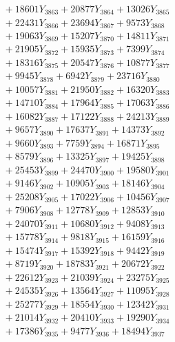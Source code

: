 \documentclass[a4paper,10pt]{article}
\begin{document}
{\begin{align}
&\;  + 18601 Y_{3863} + 20877 Y_{3864} + 13026 Y_{3865} \\[0.3ex]
&\;  + 22431 Y_{3866} + 23694 Y_{3867} + 9573 Y_{3868} \\[0.5ex]\allowbreak
&\;  + 19063 Y_{3869} + 15207 Y_{3870} + 14811 Y_{3871} \\[0.3ex]
&\;  + 21905 Y_{3872} + 15935 Y_{3873} + 7399 Y_{3874} \\[0.3ex]
&\;  + 18316 Y_{3875} + 20547 Y_{3876} + 10877 Y_{3877} \\[0.3ex]
&\;  + 9945 Y_{3878} + 6942 Y_{3879} + 23716 Y_{3880} \\[0.3ex]
&\;  + 10057 Y_{3881} + 21950 Y_{3882} + 16320 Y_{3883} \\[0.3ex]
&\;  + 14710 Y_{3884} + 17964 Y_{3885} + 17063 Y_{3886} \\[0.3ex]
&\;  + 16082 Y_{3887} + 17122 Y_{3888} + 24213 Y_{3889} \\[0.3ex]
&\;  + 9657 Y_{3890} + 17637 Y_{3891} + 14373 Y_{3892} \\[0.3ex]
&\;  + 9660 Y_{3893} + 7759 Y_{3894} + 16871 Y_{3895} \\[0.3ex]
&\;  + 8579 Y_{3896} + 13325 Y_{3897} + 19425 Y_{3898} \\[0.5ex]\allowbreak
&\;  + 25453 Y_{3899} + 24470 Y_{3900} + 19580 Y_{3901} \\[0.3ex]
&\;  + 9146 Y_{3902} + 10905 Y_{3903} + 18146 Y_{3904} \\[0.3ex]
&\;  + 25208 Y_{3905} + 17022 Y_{3906} + 10456 Y_{3907} \\[0.3ex]
&\;  + 7906 Y_{3908} + 12778 Y_{3909} + 12853 Y_{3910} \\[0.3ex]
&\;  + 24070 Y_{3911} + 10680 Y_{3912} + 9408 Y_{3913} \\[0.3ex]
&\;  + 15778 Y_{3914} + 9818 Y_{3915} + 16159 Y_{3916} \\[0.3ex]
&\;  + 15474 Y_{3917} + 15392 Y_{3918} + 9442 Y_{3919} \\[0.3ex]
&\;  + 8719 Y_{3920} + 18783 Y_{3921} + 20672 Y_{3922} \\[0.3ex]
&\;  + 22612 Y_{3923} + 21039 Y_{3924} + 23275 Y_{3925} \\[0.3ex]
&\;  + 24535 Y_{3926} + 13564 Y_{3927} + 11095 Y_{3928} \\[0.5ex]\allowbreak
&\;  + 25277 Y_{3929} + 18554 Y_{3930} + 12342 Y_{3931} \\[0.3ex]
&\;  + 21014 Y_{3932} + 20410 Y_{3933} + 19290 Y_{3934} \\[0.3ex]
&\;  + 17386 Y_{3935} + 9477 Y_{3936} + 18494 Y_{3937} \\[0.3ex]

\end{align}}
\end{document}
